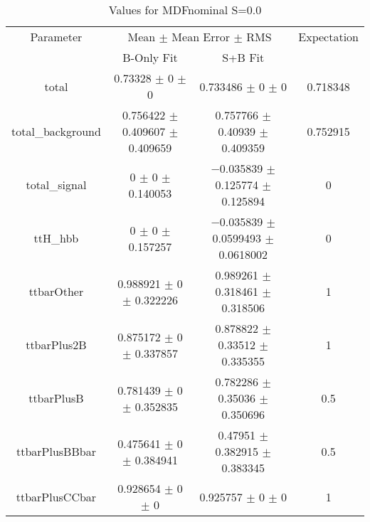 \begin{table}
\centering
\caption{Values for MDFnominal S=0.0}
\begin{tabular}{cccc}
\toprule
Parameter & \multicolumn{2}{c}{Mean $\pm$ Mean Error $\pm$ RMS} & Expectation\\
 & B-Only Fit & S+B Fit & \\
\midrule
total & \num{0.73328} $\pm$ \num{0} $\pm$ \num{0} & \num{0.733486} $\pm$ \num{0} $\pm$ \num{0} & \num{0.718348}\\
total\_background & \num{0.756422} $\pm$ \num{0.409607} $\pm$ \num{0.409659} & \num{0.757766} $\pm$ \num{0.40939} $\pm$ \num{0.409359} & \num{0.752915}\\
total\_signal & \num{0} $\pm$ \num{0} $\pm$ \num{0.140053} & \num{-0.035839} $\pm$ \num{0.125774} $\pm$ \num{0.125894} & \num{0}\\
ttH\_hbb & \num{0} $\pm$ \num{0} $\pm$ \num{0.157257} & \num{-0.035839} $\pm$ \num{0.0599493} $\pm$ \num{0.0618002} & \num{0}\\
ttbarOther & \num{0.988921} $\pm$ \num{0} $\pm$ \num{0.322226} & \num{0.989261} $\pm$ \num{0.318461} $\pm$ \num{0.318506} & \num{1}\\
ttbarPlus2B & \num{0.875172} $\pm$ \num{0} $\pm$ \num{0.337857} & \num{0.878822} $\pm$ \num{0.33512} $\pm$ \num{0.335355} & \num{1}\\
ttbarPlusB & \num{0.781439} $\pm$ \num{0} $\pm$ \num{0.352835} & \num{0.782286} $\pm$ \num{0.35036} $\pm$ \num{0.350696} & \num{0.5}\\
ttbarPlusBBbar & \num{0.475641} $\pm$ \num{0} $\pm$ \num{0.384941} & \num{0.47951} $\pm$ \num{0.382915} $\pm$ \num{0.383345} & \num{0.5}\\
ttbarPlusCCbar & \num{0.928654} $\pm$ \num{0} $\pm$ \num{0} & \num{0.925757} $\pm$ \num{0} $\pm$ \num{0} & \num{1}\\
\bottomrule
\end{tabular}
\end{table}